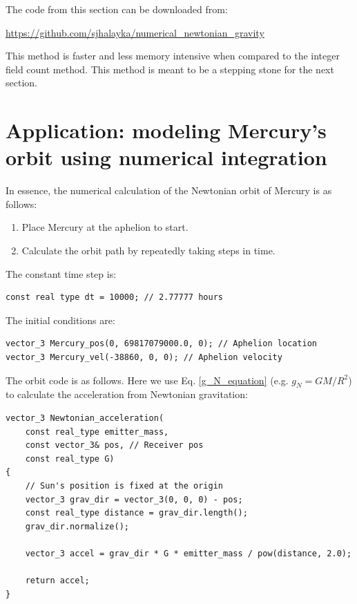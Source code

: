 \documentclass[12pt]{article}
\begin{document}
The code from this section can be downloaded from:

\url{https://github.com/sjhalayka/numerical_newtonian_gravity}

This method is faster and less memory intensive when compared to the integer field count method.
This method is meant to be a stepping stone for the next section.





\section{Application: modeling Mercury's orbit using numerical integration}

In essence, the numerical calculation of the Newtonian orbit of Mercury is as follows:
\begin{enumerate}
\item Place Mercury at the aphelion to start.
\item Calculate the orbit path by repeatedly taking steps in time.
\end{enumerate}

The constant time step \cite{fiedler1} is:
\begin{lstlisting}
const real type dt = 10000; // 2.77777 hours
\end{lstlisting}

The initial conditions are:
\begin{lstlisting}
vector_3 Mercury_pos(0, 69817079000.0, 0); // Aphelion location
vector_3 Mercury_vel(-38860, 0, 0); // Aphelion velocity
\end{lstlisting}

The orbit code is as follows. 
Here we use Eq. \ref{g_N_equation} (e.g. $g_N = {G M}/{R^2}$) to calculate the acceleration from Newtonian gravitation:
\begin{lstlisting}
vector_3 Newtonian_acceleration(
	const real_type emitter_mass,
	const vector_3& pos, // Receiver pos
	const real_type G)
{
	// Sun's position is fixed at the origin
	vector_3 grav_dir = vector_3(0, 0, 0) - pos;
	const real_type distance = grav_dir.length();
	grav_dir.normalize();

	vector_3 accel = grav_dir * G * emitter_mass / pow(distance, 2.0);

	return accel;
}
\end{lstlisting}
\end{document}
